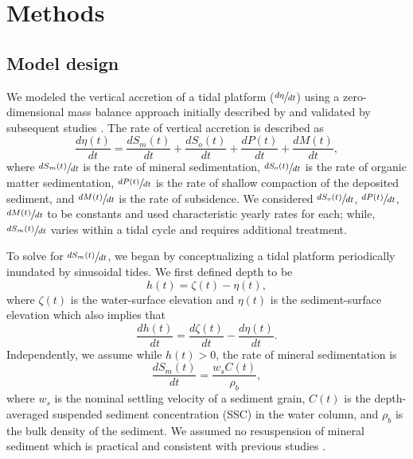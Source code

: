 \section{Methods}

\subsection{Model design}

We modeled the vertical accretion of a tidal platform ($\sfrac{d\eta}{dt}$) using a zero-dimensional mass balance approach initially described by \citet{kroneMethodSimulatingMarsh1987} and validated by subsequent studies \citep{allenSaltmarshGrowthStratification1990,frenchNumericalSimulationVertical1993,temmermanModellingLongtermTidal2003,temmermanModellingEstuarineVariations2004}. The rate of vertical accretion is described as
\begin{equation}\label{eq:mass_bal}
	\frac{d\eta(t)}{dt} = \frac{dS_m(t)}{dt} + \frac{dS_o(t)}{dt} + \frac{dP(t)}{dt} + \frac{dM(t)}{dt},
\end{equation}
where $\sfrac{dS_m(t)}{dt}$ is the rate of mineral sedimentation, $\sfrac{dS_o(t)}{dt}$ is the rate of organic matter sedimentation, $\sfrac{dP(t)}{dt}$ is the rate of shallow compaction of the deposited sediment, and $\sfrac{dM(t)}{dt}$ is the rate of subsidence. We considered $\sfrac{dS_o(t)}{dt}$, $\sfrac{dP(t)}{dt}$, $\sfrac{dM(t)}{dt}$ to be constants and used characteristic yearly rates for each; while, $\sfrac{dS_m(t)}{dt}$ varies within a tidal cycle \citep{haleSeasonalVariabilityForces2019} and requires additional treatment.

To solve for $\sfrac{dS_m(t)}{dt}$, we began by conceptualizing a tidal platform periodically inundated by sinusoidal tides. We first defined depth to be
\begin{equation}\label{eq:depth}
	h(t) = \zeta(t) - \eta(t),
\end{equation}
where $\zeta(t)$ is the water-surface elevation and $\eta(t)$ is the sediment-surface elevation which also implies that
\begin{equation}\label{eq:depth_dt}
	\frac{dh(t)}{dt} = \frac{d\zeta(t)}{dt} - \frac{d\eta(t)}{dt}.
\end{equation}
Independently, we assume while $h(t) > 0$, the rate of mineral sedimentation is
\begin{equation}\label{eq:sed_flux}
	\frac{dS_m(t)}{dt} = \frac{w_sC(t)}{\rho_b},
\end{equation}
where $w_s$ is the nominal settling velocity of a sediment grain, $C(t)$ is the depth-averaged suspended sediment concentration (SSC) in the water column, and $\rho_b$ is the bulk density of the sediment. We assumed no resuspension of mineral sediment which is practical and consistent with previous studies \citep{kroneMethodSimulatingMarsh1987, allenSaltmarshGrowthStratification1990, frenchNumericalSimulationVertical1993, temmermanModellingLongtermTidal2003, temmermanModellingEstuarineVariations2004}.

